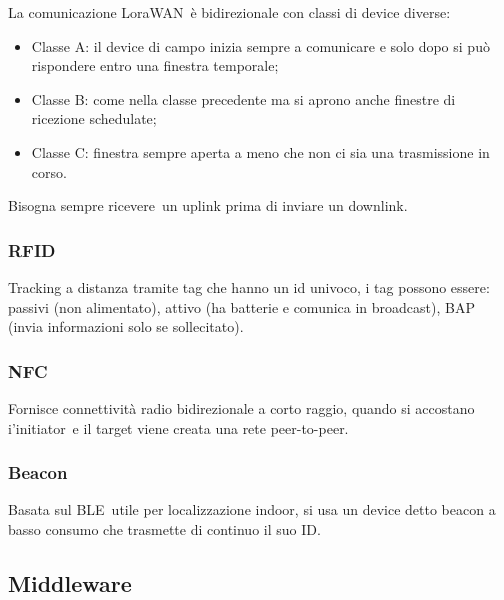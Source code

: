 \documentclass[
]{article}
\providecommand{\tightlist}{%
  \setlength{\itemsep}{0pt}\setlength{\parskip}{0pt}}
\begin{document}
{}

{La comunicazione }{LoraWAN}{~è bidirezionale con classi di device
diverse:}

\begin{itemize}
\tightlist
\item
  {Classe A: il device di campo inizia sempre a comunicare e solo dopo
  si può rispondere entro una finestra temporale;}
\item
  {Classe B: come nella classe precedente ma si aprono anche finestre di
  ricezione schedulate;}
\item
  {Classe C: finestra sempre aperta a meno che non ci sia una
  trasmissione in corso.}
\end{itemize}

{Bisogna sempre }{ricevere}{~un uplink prima di inviare un downlink.}

\subsubsection{\texorpdfstring{{RFID}}{RFID}}\label{h.uor8twwgml7f}

{Tracking a distanza tramite tag che hanno un id univoco, i tag possono
essere: passivi (non alimentato), attivo (ha batterie e comunica in
broadcast), BAP (invia informazioni solo se sollecitato).}

\subsubsection{\texorpdfstring{{NFC}}{NFC}}\label{h.51tzaem78ovm}

{Fornisce connettività radio bidirezionale a corto raggio, quando si
accostano }{i'initiator}{~e il target viene creata una rete
peer-to-peer.}

\subsubsection{\texorpdfstring{{Beacon}}{Beacon}}\label{h.d26yzvr1y8xp}

{Basata sul BLE}{~utile per localizzazione indoor, si usa un device
detto beacon a basso consumo che trasmette di continuo il suo ID.}

{}

\subsection{\texorpdfstring{{Middleware}}{Middleware}}\label{h.get83xlysmi6}
\end{document}
